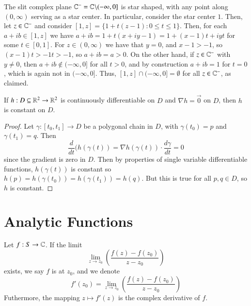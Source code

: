 \begin{example}
    The slit complex plane $\mathbb C^- = \mathbb C\backslash(-\infty,0]$ is star shaped, with any point along $(0,\infty)$ serving as a star center. In particular, consider the star center $1$. Then, let $z \in \mathbb C^-$ and consider $[1,z] = \{1+t(z-1):0\leq t\leq 1\}$. Then, for each $a+ib \in [1,z]$ we have $a+ib = 1+t(x+iy-1) = 1+(x-1)t+iyt$ for some $t \in [0,1]$. For $z \in (0,\infty)$ we have that $y = 0$, and $x-1 > -1$, so $(x-1)t > -1t > -1$, so $a+ib = a > 0$. On the other hand, if $z \in \mathbb C^-$ with $y \neq 0$, then $a+ib \notin (-\infty,0]$ for all $t > 0$, and by construction $a+ib = 1$ for $t = 0$, which is again not in $(-\infty,0]$. Thus, $[1,z] \cap (-\infty,0] = \emptyset$ for all $z \in \mathbb C^-$, as claimed.
\end{example}


\begin{theorem}\label{thm:constant}
    If $h:D\subseteq \mathbb R^2\rightarrow\mathbb R^2$ is continuously differentiable on $D$ and $\nabla h= \vec{0}$ on $D$, then $h$ is constant on $D$.
\end{theorem}
\begin{proof}
    Let $\gamma:[t_0,t_1]\rightarrow D$ be a polygonal chain in $D$, with $\gamma(t_0) = p$ and $\gamma(t_1) = q$. Then \begin{equation*}
        \frac{d}{dt}(h(\gamma(t)) = \nabla h(\gamma(t)) \cdot \frac{d\gamma}{dt} = 0
    \end{equation*}
    since the gradient is zero in $D$. Then by properties of single variable differentiable functions, $h(\gamma(t))$ is constant so $h(p) = h(\gamma(t_0)) = h(\gamma(t_1)) = h(q)$. But this is true for all $p,q \in D$, so $h$ is constant.
\end{proof}



\section{Analytic Functions}

\begin{definition}
    Let $f:S\rightarrow \mathbb C$. If the limit \begin{equation*}
        \lim\limits_{z\rightarrow z_0}\left(\frac{f(z) - f(z_0)}{z-z_0}\right)
    \end{equation*}
    exists, we say $f$ is  at $z_0$, and we denote \begin{equation*}
        f'(z_0) = \lim\limits_{z\rightarrow z_0}\left(\frac{f(z) - f(z_0)}{z-z_0}\right)
    \end{equation*}
    Futhermore, the mapping $z\mapsto f'(z)$ is the complex derivative of $f$.
\end{definition}

